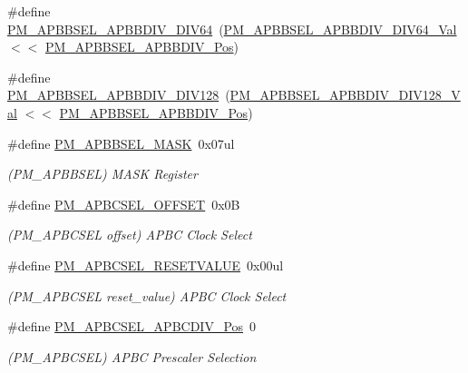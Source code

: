 \begin{DoxyCompactItemize}
\item 
\#define \mbox{\hyperlink{group___s_a_m_d21___p_m_ga1f0687be10f9f3192585e656f2f6433f}{P\+M\+\_\+\+A\+P\+B\+B\+S\+E\+L\+\_\+\+A\+P\+B\+B\+D\+I\+V\+\_\+\+D\+I\+V64}}~(\mbox{\hyperlink{group___s_a_m_d21___p_m_ga2f3fd93521a232a039f3d891efed5b0f}{P\+M\+\_\+\+A\+P\+B\+B\+S\+E\+L\+\_\+\+A\+P\+B\+B\+D\+I\+V\+\_\+\+D\+I\+V64\+\_\+\+Val}}  $<$$<$ \mbox{\hyperlink{group___s_a_m_d21___p_m_ga96e9f272a436f893bd20fbdf05644b79}{P\+M\+\_\+\+A\+P\+B\+B\+S\+E\+L\+\_\+\+A\+P\+B\+B\+D\+I\+V\+\_\+\+Pos}})
\item 
\#define \mbox{\hyperlink{group___s_a_m_d21___p_m_gaf3d41c6fa918141eb2873f289dc8ad6b}{P\+M\+\_\+\+A\+P\+B\+B\+S\+E\+L\+\_\+\+A\+P\+B\+B\+D\+I\+V\+\_\+\+D\+I\+V128}}~(\mbox{\hyperlink{group___s_a_m_d21___p_m_ga7b5c5d49588ec48addaf4b6e23937865}{P\+M\+\_\+\+A\+P\+B\+B\+S\+E\+L\+\_\+\+A\+P\+B\+B\+D\+I\+V\+\_\+\+D\+I\+V128\+\_\+\+Val}} $<$$<$ \mbox{\hyperlink{group___s_a_m_d21___p_m_ga96e9f272a436f893bd20fbdf05644b79}{P\+M\+\_\+\+A\+P\+B\+B\+S\+E\+L\+\_\+\+A\+P\+B\+B\+D\+I\+V\+\_\+\+Pos}})
\item 
\#define \mbox{\hyperlink{group___s_a_m_d21___p_m_ga2f430fa8cd7cb5418110f32292f28315}{P\+M\+\_\+\+A\+P\+B\+B\+S\+E\+L\+\_\+\+M\+A\+SK}}~0x07ul
\begin{DoxyCompactList}\small\item\em (P\+M\+\_\+\+A\+P\+B\+B\+S\+EL) M\+A\+SK Register \end{DoxyCompactList}\item 
\#define \mbox{\hyperlink{group___s_a_m_d21___p_m_ga428763f4ad33829944c5364a712c21ae}{P\+M\+\_\+\+A\+P\+B\+C\+S\+E\+L\+\_\+\+O\+F\+F\+S\+ET}}~0x0B
\begin{DoxyCompactList}\small\item\em (P\+M\+\_\+\+A\+P\+B\+C\+S\+EL offset) A\+P\+BC Clock Select \end{DoxyCompactList}\item 
\#define \mbox{\hyperlink{group___s_a_m_d21___p_m_ga54959672e4e7f0598a416620d0657f76}{P\+M\+\_\+\+A\+P\+B\+C\+S\+E\+L\+\_\+\+R\+E\+S\+E\+T\+V\+A\+L\+UE}}~0x00ul
\begin{DoxyCompactList}\small\item\em (P\+M\+\_\+\+A\+P\+B\+C\+S\+EL reset\+\_\+value) A\+P\+BC Clock Select \end{DoxyCompactList}\item 
\#define \mbox{\hyperlink{group___s_a_m_d21___p_m_ga4a8379c87e542ce1f35e688187aac873}{P\+M\+\_\+\+A\+P\+B\+C\+S\+E\+L\+\_\+\+A\+P\+B\+C\+D\+I\+V\+\_\+\+Pos}}~0
\begin{DoxyCompactList}\small\item\em (P\+M\+\_\+\+A\+P\+B\+C\+S\+EL) A\+P\+BC Prescaler Selection \end{DoxyCompactList}\item 

\end{DoxyCompactItemize}
